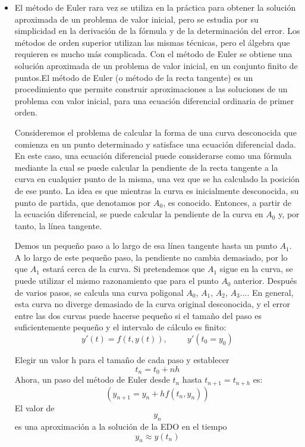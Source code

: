 \documentclass[12 pt,letterpaper]{article}
\begin{document}
   \begin{itemize}
   \item\justify 
   El método de Euler rara vez se utiliza en la práctica para obtener la solución aproximada de un problema de valor inicial, pero se estudia por su simplicidad en la derivación de la fórmula y de la determinación del error. Los métodos de orden superior utilizan las mismas técnicas, pero el álgebra que requieren es mucho más complicada. Con el método de Euler se obtiene una solución aproximada de un problema de valor inicial, en un conjunto finito de puntos.El método de Euler (o método de la recta tangente) es un procedimiento que permite construir aproximaciones a las soluciones de un problema con valor inicial, para una ecuación diferencial ordinaria de primer orden.

   \begin{flushleft}
\fbox{\textcolor{purple}{Ejercicio de aplicación}}\vspace{0.5cm}
	\end{flushleft}

	\justify 
    Consideremos el problema de calcular la forma de una curva desconocida que comienza en un punto determinado y satisface una ecuación diferencial dada. En este caso, una ecuación diferencial puede considerarse como una fórmula mediante la cual se puede calcular la pendiente de la recta tangente a la curva en cualquier punto de la misma, una vez que se ha calculado la posición de ese punto. La idea es que mientras la curva es inicialmente desconocida, su punto de partida, que denotamos por {$A_{0} $}, es conocido. Entonces, a partir de la ecuación diferencial, se puede calcular la pendiente de la curva en {$A_{0} $} y, por tanto, la línea tangente.
			
	Demos un pequeño paso a lo largo de esa línea tangente hasta un punto {$A_{1} $}. A lo largo de este pequeño paso, la pendiente no cambia demasiado, por lo que {$A_{1} $} estará cerca de la curva. Si pretendemos que {$A_{1} $} sigue en la curva, se puede utilizar el mismo razonamiento que para el punto {$A_{0} $} anterior. Después de varios pasos, se calcula una curva poligonal {$A_{0} $}, {$A_{1} $}, {$A_{2} $}, {$A_{3} $}.... En general, esta curva no diverge demasiado de la curva original desconocida, y el error entre las dos curvas puede hacerse pequeño si el tamaño del paso es suficientemente pequeño y el intervalo de cálculo es finito: \[y'(t)= f(t,y(t)), \hspace{1cm}  y'(t_{0}=y_{0}) \]\vspace{0.3cm}

        Elegir un valor h para el tamaño de cada paso y establecer
		\[ 
		t_{n}=t_{0}+nh
		\]
		\vspace{0.5cm}
		Ahora, un paso del método de Euler desde $t_{n}$ hasta $t_{n+1} = t_{n+h}$ es:
		\[ 
		(y_{n+1}=y_{n}+hf(t_{n},y_{n}))
		\]
		\vspace{0.5cm}
		El valor de  \[y_{n}\]  es una aproximación a la solución de la EDO en el tiempo \[y_{n}\approx y(t_{n})\]
        
 	
	\end{itemize}
\end{document}

